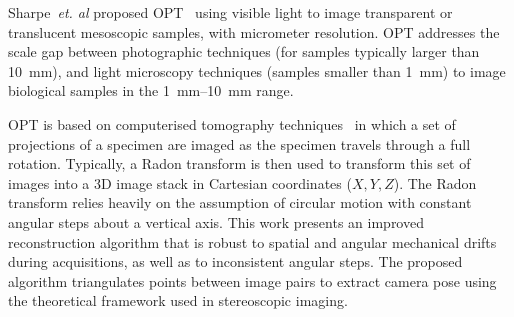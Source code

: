 \documentclass{osa-article}
\begin{document}


Sharpe~\emph{et. al} proposed \gls{OPT}~\cite{sharpeOpticalProjectionTomography2002}
using visible light to image transparent or translucent mesoscopic samples, with micrometer resolution.
\gls{OPT} addresses the scale gap between photographic techniques (for samples typically larger than \SI{10}{\milli\meter}), and light microscopy techniques (samples smaller than \SI{1}{\milli\meter}) to image biological samples in the \SIrange{1}{10}{\milli\meter} range.


\gls{OPT} is based on computerised tomography techniques~\cite{kakPrinciplesComputerizedTomographic2001} in which a set of projections of a specimen are imaged as the specimen travels through a full rotation.
Typically, a Radon transform is then used to transform this set of images into a 3D image stack in Cartesian coordinates (\(X,Y,Z\)).
The \gls{Radon transform} relies heavily on the assumption of circular motion with constant angular steps about a vertical axis.
This work presents an improved reconstruction algorithm that is robust to spatial and angular mechanical drifts during acquisitions, as well as to inconsistent angular steps.
The proposed algorithm triangulates points between image pairs to extract camera pose using the theoretical framework used in stereoscopic imaging. %
\end{document}
